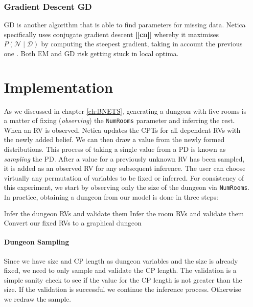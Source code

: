 \documentclass{UoYCSproject}
\begin{document}
\subsubsection{Gradient Descent GD}
GD is another algorithm that is able to find parameters for missing data. Netica specifically uses conjugate gradient descent \textbf{[[cn]]} whereby it maximises \(P(\mathcal{N} \mid \mathcal{D})\) by computing the steepest gradient, taking in account the previous one \parencite[p47]{neticaCman}. Both EM and GD risk getting stuck in local optima.

\section{Implementation}
\label{sec:implementation}
\paragraph{}
As we discussed in chapter \ref{ch:BNETS}, generating a dungeon with five rooms is a matter of fixing (\textit{observing}) the \texttt{NumRooms} parameter and inferring the rest. When an RV is observed, Netica updates the CPTs for all dependent RVs with the newly added belief. We can then draw a value from the newly formed distributions. This process of taking a single value from a PD is known as \textit{sampling} the PD. After a value for a previously unknown RV has been sampled, it is added as an observed RV for any subsequent inference. The user can choose virtually any permutation of variables to be fixed or inferred. For consistency of this experiment, we start by observing only the size of the dungeon via \texttt{NumRooms}. In practice, obtaining a dungeon from our model is done in three steps:

\begin{outline}[enumerate]
  \1 Infer the dungeon RVs and validate them
  \1 Infer the room RVs and validate them
  \1 Convert our fixed RVs to a graphical dungeon
\end{outline}


\paragraph{Dungeon Sampling} %
 Since we have size and CP length as dungeon variables and the size is already fixed, we need to only sample and validate the CP length. The validation is a simple sanity check to see if the value for the CP length is not greater than the size. If the validation is successful we continue the inference process. Otherwise we redraw the sample.
\end{document}
